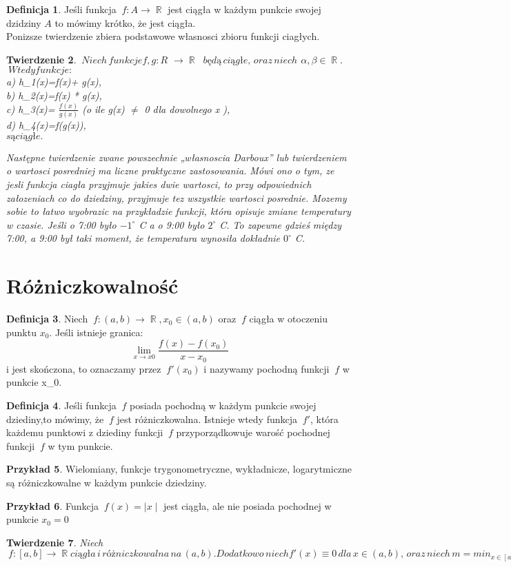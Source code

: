 \documentclass[12pt,a4paper]{article}
\newtheorem{tw}{Twierdzenie}[section]
\theoremstyle{definition}
\newtheorem{df}[tw]{Definicja}
\newtheorem{ex}[tw]{Przykład}
\DeclareMathOperator{\R}{\mathbb{R}}
\begin{document}
\begin{df} Jeśli funkcja $\ f: A\rightarrow\R$ jest ciągła w każdym punkcie swojej dzidziny $ A$ to mówimy krótko, że jest ciągła.
\\Ponizsze twierdzenie zbiera podstawowe własnosci zbioru funkcji ciagłych.
\end{df}
\begin{tw} $ \ Niech\,funkcje  f,g: R$ $ \rightarrow\R$ $ \ będą\,ciągłe,\,oraz\,niech$ $ \alpha,\beta\in\R.$ $ \ Wtedy funkcje: $
\\a) h_1(x)=\alpha * f(x)+ \beta * g(x),
\\b) h_2(x)=f(x) * g(x),
\\c) h_3(x)=  $ \frac{f(x)}{g(x)} $ (o ile g(x) $\neq$ 0 dla dowolnego x \in \R),
\\d) h_4(x)=f(g(x)),  
\\$ są ciągłe. $

Następne twierdzenie zwane powszechnie „własnoscia Darboux” lub twierdzeniem
o wartosci posredniej ma liczne praktyczne zastosowania. Mówi ono o tym,
ze jesli funkcja ciagła przyjmuje jakies dwie wartosci, to przy odpowiednich załozeniach
co do dziedziny, przyjmuje tez wszystkie wartosci posrednie. Mozemy sobie to
łatwo wyobrazic na przykładzie funkcji, która opisuje zmiane temperatury w czasie. Jeśli o 7:00 było $-1^{\circ}$ C a o 9:00 było $2^{\circ}$ C. To zapewne gdzieś między 7:00, a 9:00 był taki moment, że temperatura wynosiła dokładnie $0^{\circ}$ C.


\end{tw}
\section{Różniczkowalność}
\begin{df}
Niech $\ f : (a,b)\rightarrow \R,x_0 \in(a,b)$ oraz $\ f$ ciągła w otoczeniu punktu $x_0$. Jeśli istnieje granica:
$$\lim_{x\rightarrow x0}\frac{f(x)-f(x_0)}{x-x_0}$$
i jest skończona, to oznaczamy przez $\ f'(x_0)$ i nazywamy pochodną funkcji $\ f$ w punkcie x_0.
\end{df}
\begin{df}
Jeśli funkcja $\ f$ posiada pochodną w każdym punkcie swojej dziediny,to mówimy, że $\ f$ jest różniczkowalna. Istnieje wtedy funkcja $\ f'$, która każdemu punktowi z dziediny funkcji $\ f$ przyporządkowuje warość pochodnej funkcji $\ f$ w tym punkcie.
\end{df}
\begin{ex}
Wielomiany, funkcje trygonometryczne, wykładnicze, logarytmiczne są różniczkowalne w każdym punkcie dziedziny.
\end{ex}
\begin{ex}
Funkcja $\ f(x) =\mid x \mid$ jest ciągła, ale nie posiada pochodnej w punkcie $ x_0=0$
\end{ex}
\begin{tw}
Niech $\ f:[a,b]\rightarrow\R ciągła\, i \,różniczkowalna\, na\, (a,b). Dodatkowo\, niech f'(x)\equiv 0\, dla\, x \in (a,b),\, oraz\, niech\, m=min_{x\in[a,b]}\,f(x),\, M = max_{x\in[a,b]}\,f(x). Wtedy\, na \,pewno f(a) = m,\, f(b) = M\, lub\, f(a) = M\, i\, f(b) = m.$ 
\end{tw}  
\end{document}
